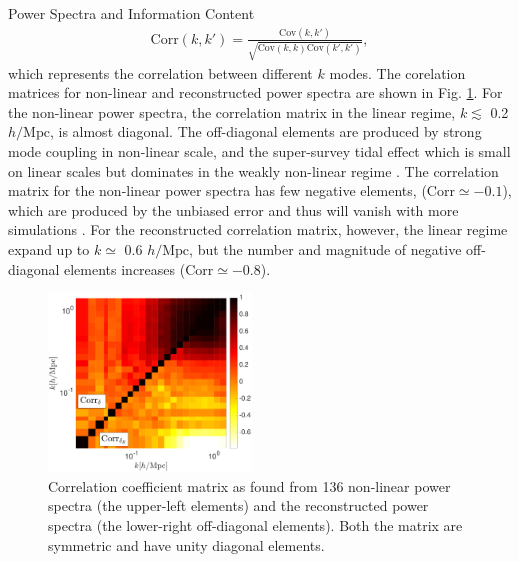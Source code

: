 \begin{section}{Power Spectra and Information Content}
\begin{align}
    \mathrm{Corr}\left(k,k'\right)=\frac{\mathrm{Cov}\left(k,k'\right)}{\sqrt{\mathrm{Cov}\left(k,k\right)\mathrm{Cov}\left(k',k'\right)}},
\end{align}
which represents the correlation between different $k$ modes. 
The corelation matrices for non-linear and reconstructed power spectra 
are shown in Fig. \ref{fig:corrall}. For the non-linear power spectra, the
correlation matrix in the linear regime, $k \lesssim$ 0.2 $h/\mathrm{Mpc}$, is almost diagonal. 
The off-diagonal elements are produced by 
strong mode coupling in non-linear scale, and the super-survey tidal effect which is small on 
linear scales but dominates in the weakly non-linear regime \cite{bib:Kazuyuki2016}.
The correlation matrix for the non-linear power spectra has few negative elements,
($\mathrm{Corr} \simeq -0.1$), which are produced by the unbiased error and thus 
 will vanish with more simulations \cite{bib:Takahashi2009}.
 For the reconstructed correlation matrix, however, the linear regime expand up to $k \simeq$ 0.6 $h/\mathrm{Mpc}$, 
but the number and magnitude of negative off-diagonal elements increases ($\mathrm{Corr} \simeq -0.8$). 

\begin{figure}
 \centering
  \includegraphics[width=0.48\textwidth]{corrmat_hot_2-crop.pdf}
  \caption{Correlation coefficient matrix as found from 136 non-linear power spectra 
(the upper-left elements) and the reconstructed power spectra (the lower-right off-diagonal elements). 
Both the matrix are symmetric and have unity diagonal elements.}
    \label{fig:corrall}
\end{figure}



\end{section}
